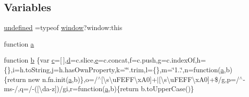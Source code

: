 \subsection*{Variables}
\begin{DoxyCompactItemize}
\item 
\hyperlink{jquery-1_811_80_8js_ae21cc36bf0d65014c717a481a3f8a468}{undefined} =typeof \hyperlink{classie_8js_a04a8a2bbfa9c15500892b8e5033d625b}{window}?window\+:this
\item 
function \hyperlink{jquery-1_811_80_8js_aa4d4888597588a84fd5b1184d00c91f3}{a}
\item 
function \hyperlink{jquery-1_811_80_8js_ac0431efac4d7c393d1e70b86115cb93f}{b} \{var \hyperlink{bootstrap_8min_8js_ad9d1ac02e33c4aed62ad517a7cb8b3fb}{c}=\mbox{[}$\,$\mbox{]},\hyperlink{bootstrap_8min_8js_aeb337d295abaddb5ec3cb34cc2e2bbc9}{d}=c.\+slice,\hyperlink{bootstrap_8min_8js_ab5902775854a8b8440bcd25e0fe1c120}{e}=c.\+concat,f=c.\+push,g=c.\+index\+Of,h=\{\},i=h.\+to\+String,j=h.\+has\+Own\+Property,k=\char`\"{}\char`\"{}.trim,l=\{\},m=\char`\"{}1..\char`\"{},n=function(\hyperlink{bootstrap_8min_8js_a1f5870dcf487187f13d5fd328ed9e6e7}{a},b)\{return new n.\+fn.\+init(\hyperlink{bootstrap_8min_8js_a1f5870dcf487187f13d5fd328ed9e6e7}{a},b)\},o=/$^\wedge$\mbox{[}\textbackslash{}s\textbackslash{}u\+F\+E\+F\+F\textbackslash{}x\+A0\mbox{]}+$\vert$\mbox{[}\textbackslash{}s\textbackslash{}u\+F\+E\+F\+F\textbackslash{}x\+A0\mbox{]}+\$/g,p=/$^\wedge$-\/ms-\//,q=/-\/(\mbox{[}\textbackslash{}da-\/z\mbox{]})/gi,r=function(\hyperlink{bootstrap_8min_8js_a1f5870dcf487187f13d5fd328ed9e6e7}{a},b)\{return b.\+to\+Upper\+Case()\}
\item 

\end{DoxyCompactItemize}
